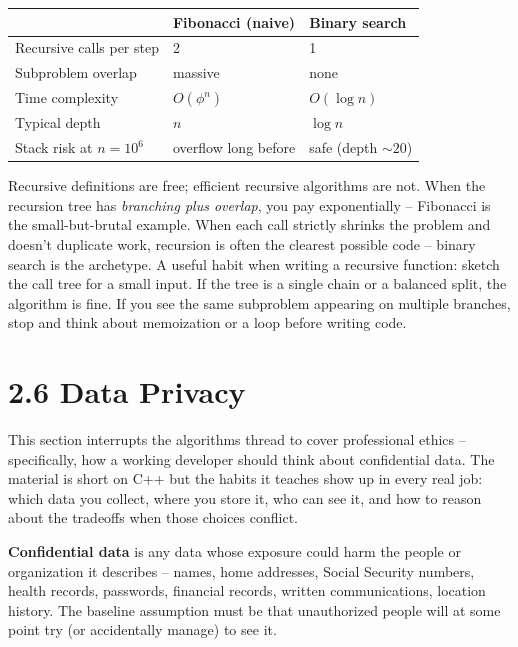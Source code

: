 \documentclass[11pt]{article}
\begin{document}
\begin{center}
\small
\begin{tabular}{lll}
& \textbf{Fibonacci (naive)} & \textbf{Binary search} \\
\hline
Recursive calls per step & 2 & 1 \\
Subproblem overlap & massive & none \\
Time complexity & $O(\phi^n)$ & $O(\log n)$ \\
Typical depth & $n$ & $\log n$ \\
Stack risk at $n = 10^6$ & overflow long before & safe (depth $\sim 20$) \\
\end{tabular}
\normalsize
\end{center}

\begin{ideabox}
Recursive definitions are free; efficient recursive algorithms are
not. When the recursion tree has \emph{branching plus overlap}, you
pay exponentially -- Fibonacci is the small-but-brutal example.
When each call strictly shrinks the problem and doesn't duplicate
work, recursion is often the clearest possible code -- binary search
is the archetype. A useful habit when writing a recursive function:
sketch the call tree for a small input. If the tree is a single
chain or a balanced split, the algorithm is fine. If you see the
same subproblem appearing on multiple branches, stop and think about
memoization or a loop before writing code.
\end{ideabox}

\section{2.6 Data Privacy}

This section interrupts the algorithms thread to cover professional
ethics -- specifically, how a working developer should think about
confidential data. The material is short on C++ but the habits it
teaches show up in every real job: which data you collect, where you
store it, who can see it, and how to reason about the tradeoffs when
those choices conflict.

\begin{defnbox}
\textbf{Confidential data} is any data whose exposure could harm the
people or organization it describes -- names, home addresses, Social
Security numbers, health records, passwords, financial records,
written communications, location history. The baseline assumption
must be that unauthorized people will at some point try (or
accidentally manage) to see it.
\end{defnbox}
\end{document}
